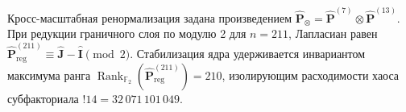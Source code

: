 \documentclass[10pt,twocolumn,fleqn]{article}
\DeclareMathOperator{\Rank}{Rank}
\begin{document}
Кросс-масштабная ренормализация задана произведением $\hat{\mathbf{P}}_{\otimes} = \hat{\mathbf{P}}^{(7)} \otimes \hat{\mathbf{P}}^{(13)}$. При редукции граничного слоя по модулю 2 для $n=211$, Лапласиан равен $\hat{\mathbf{P}}_{\text{reg}}^{(211)} \equiv \hat{\mathbf{J}} - \hat{\mathbf{I}} \pmod 2$. Стабилизация ядра удерживается инвариантом максимума ранга $\Rank_{\mathbb{F}_2}(\hat{\mathbf{P}}_{\text{reg}}^{(211)}) = 210$, изолирующим расходимости хаоса субфакториала $!14 = 32\,071\,101\,049$.
\end{document}
